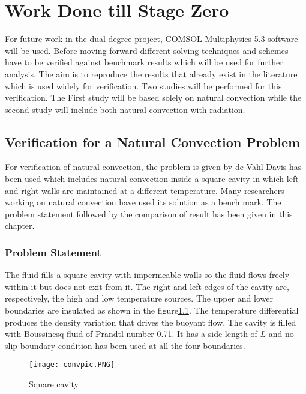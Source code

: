 \chapter{Work Done till Stage Zero} \label{ch3}
For future work in the dual degree project, COMSOL Multiphysics 5.3 software will be used. Before moving forward different solving techniques and schemes have to be verified against benchmark results which will be used for further analysis. The aim is to reproduce the results that already exist in the literature which is used widely for verification. Two studies will be performed for this verification. The First study will be based solely on natural convection while the second study will include both natural convection with radiation.
\section{Verification for a Natural Convection Problem}
For verification of natural convection, the problem is given by de Vahl Davis\citep{de1983natural} has been used which includes natural convection inside a square cavity in which left and right walls are maintained at a different temperature. Many researchers working on natural convection have used its solution as a bench mark. The problem statement followed by the comparison of result has been given in this chapter.
\subsection{Problem Statement}\label{cov_prob_st}
The fluid fills a square cavity with impermeable walls so the fluid flows freely within it but does not exit from it. The right and left edges of the cavity are, respectively, the high and low temperature sources. The upper and lower boundaries are insulated as shown in the figure\ref{convpic}. The temperature differential produces the density variation that drives the buoyant flow. The cavity is filled with Boussinesq fluid of Prandtl number 0.71. It has a side length of $L$ and no-slip boundary condition has been used at all the four boundaries.\\

\begin{figure}[H]
\begin{center}
\texttt{[image: convpic.PNG]}
\caption{Square cavity}
\label{convpic}
\end{center}
\end{figure}




